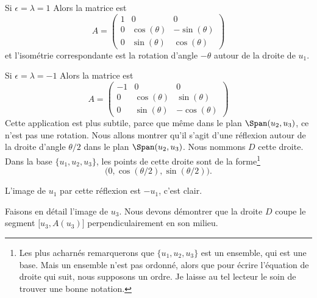 \begin{subproof}
    \item[Si \( \epsilon=\lambda=1\)] Alors la matrice est
    \begin{equation}
        A=\begin{pmatrix}
            1    &   0    &   0    \\
            0    &   \cos(\theta)    &   -\sin(\theta)    \\
            0    &   \sin(\theta)    &   \cos(\theta)
        \end{pmatrix}
    \end{equation}
    et l'isométrie correspondante est la rotation d'angle \( -\theta\) autour de la droite de \( u_1\).

    \item[Si \( \epsilon=\lambda=-1\)]
    Alors la matrice est
    \begin{equation}
        A=\begin{pmatrix}
            -1    &  0     &   0    \\
            0    &   \cos(\theta)    &   \sin(\theta)    \\
            0    &   \sin(\theta)    &   -\cos(\theta)
        \end{pmatrix}
    \end{equation}
    Cette application est plus subtile, parce que même dans le plan \( \Span(u_2,u_3)\), ce n'est pas une rotation. Nous allons montrer qu'il s'agit d'une réflexion autour de la droite d'angle \( \theta/2\) dans le plan \( \Span(u_2,u_3)\). Nous nommons \( D\) cette droite. Dans la base \( \{ u_1,u_2,u_3 \}\), les points de cette droite sont de la forme\footnote{Les plus acharnés remarquerons que \( \{ u_1,u_2,u_3 \}\) est un ensemble, qui est une base. Mais un ensemble n'est pas ordonné, alors que pour écrire l'équation de droite qui suit, nous supposons un ordre. Je laisse au tel lecteur le soin de trouver une bonne notation.}
    \begin{equation}
        \big( 0,\cos(\theta/2),\sin(\theta/2) \big).
    \end{equation}
    
    L'image de \( u_1\) par cette réflexion est \(-u_1\), c'est clair.

    Faisons en détail l'image de \( u_3\). Nous devons démontrer que la droite \( D\) coupe le segment \( \mathopen[ u_3 , A(u_3) \mathclose]\) perpendiculairement en son milieu.
    

\end{subproof}
